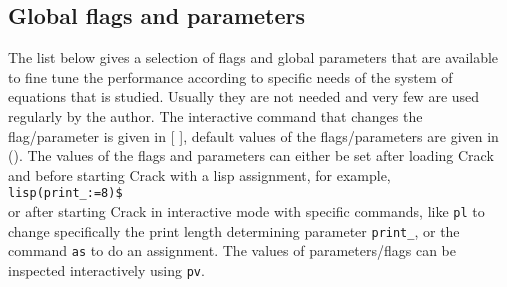 \documentclass[12pt]{article}
\begin{document}
\subsection{Global flags and parameters}
The list below gives a selection of
flags and global parameters that are available
to fine tune the performance according to specific needs of the system
of equations that is studied. Usually they are not needed and very few
are used regularly by the author. The interactive command that changes the
flag/parameter is given in [ ], default values of the flags/parameters
are given in (). The values of the flags and parameters can either be
set after loading {\sc Crack} and before starting {\sc Crack} with a
lisp assignment, for example,\\
\verb+lisp(print_:=8)$+ \\ %
or after starting {\sc Crack} in interactive mode with specific commands, 
like {\tt pl} to change specifically the print length determining parameter
{\tt print\_}, or the command {\tt as} to do an assignment. The values of
parameters/flags can be inspected interactively using {\tt pv}.
\end{document}
